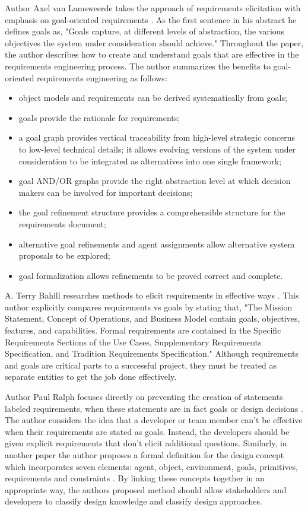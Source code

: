 \documentclass[format=acmlarge]{acmart}
\begin{document}
Author Axel van Lamsweerde takes the approach of requirements elicitation with emphasis on goal-oriented requirements \cite{vanLamsweerde2001}. As the first sentence in his abstract he defines goals as, "Goals capture, at different levels of abstraction, the various objectives the system under consideration should achieve." Throughout the paper, the author describes how to create and understand goals that are effective in the requirements engineering process. The author summarizes the benefits to goal-oriented requirements engineering as follows:
\begin{itemize}
	\item object models and requirements can be derived systematically from goals;
	\item goals provide the rationale for requirements;
	\item a goal graph provides vertical traceability from high-level strategic concerns to low-level technical details; it allows evolving versions of the system under consideration to be integrated as alternatives into one single framework;
	\item goal AND/OR graphs provide the right abstraction level at which decision makers can be involved for important decisions;
	\item the goal refinement structure provides a comprehensible structure for the requirements document; 
	\item alternative goal refinements and agent assignments allow alternative system proposals to be explored; 
	\item goal formalization allows refinements to be proved correct and complete. 
\end{itemize}

A. Terry Bahill researches methods to elicit requirements in effective ways \cite{Bahill2009}. This author explicitly compares requirements vs goals by stating that, "The Mission Statement, Concept of Operations, and Business Model contain goals, objectives, features, and capabilities. Formal requirements are contained in the Specific Requirements Sections of the Use Cases, Supplementary Requirements Specification, and Tradition Requirements Specification." Although requirements and goals are critical parts to a successful project, they must be treated as separate entities to get the job done effectively.

Author Paul Ralph focuses directly on preventing the creation of statements labeled requirements, when these statements are in fact goals or design decisions \cite{Ralph2013}. The author considers the idea that a developer or team member can't be effective when their requirements are stated as goals. Instead, the developers should be given explicit requirements that don't elicit additional questions. Similarly, in another paper the author proposes a formal definition for the design concept which incorporates seven elements: agent, object, environment, goals, primitives, requirements and constraints \cite{Ralph2009}. By linking these concepts together in an appropriate way, the authors proposed method should allow stakeholders and developers to classify design knowledge and classify design approaches.
\end{document}
